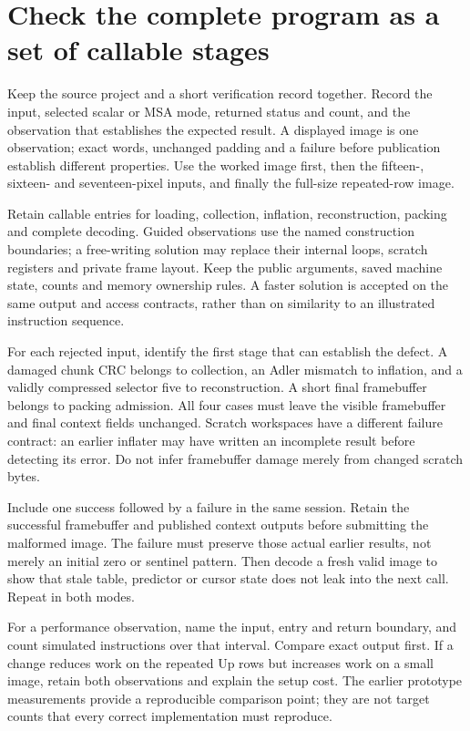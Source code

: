 \section{Check the complete program as a set of callable stages}
Keep the source project and a short verification record together. Record the input,
selected scalar or MSA mode, returned status and count, and the observation that
establishes the expected result. A displayed image is one observation; exact words,
unchanged padding and a failure before publication establish different properties.
Use the worked image first, then the fifteen-, sixteen- and seventeen-pixel inputs,
and finally the full-size repeated-row image.

Retain callable entries for loading, collection, inflation, reconstruction, packing
and complete decoding. Guided observations use the named construction boundaries;
a free-writing solution may replace their internal loops, scratch registers and
private frame layout. Keep the public arguments, saved machine state, counts and
memory ownership rules. A faster solution is accepted on the same output and access
contracts, rather than on similarity to an illustrated instruction sequence.

For each rejected input, identify the first stage that can establish the defect.
A damaged chunk CRC belongs to collection, an Adler mismatch to inflation, and a
validly compressed selector five to reconstruction. A short final framebuffer belongs
to packing admission. All four cases must leave the visible framebuffer and final
context fields unchanged. Scratch workspaces have a different failure contract: an
earlier inflater may have written an incomplete result before detecting its error.
Do not infer framebuffer damage merely from changed scratch bytes.

Include one success followed by a failure in the same session. Retain the successful
framebuffer and published context outputs before submitting the malformed image.
The failure must preserve those actual earlier results, not merely an initial zero
or sentinel pattern. Then decode a fresh valid image to show that stale table,
predictor or cursor state does not leak into the next call. Repeat in both modes.

For a performance observation, name the input, entry and return boundary, and count
simulated instructions over that interval. Compare exact output first. If a change
reduces work on the repeated Up rows but increases work on a small image, retain
both observations and explain the setup cost. The earlier prototype measurements
provide a reproducible comparison point; they are not target counts that every
correct implementation must reproduce.
